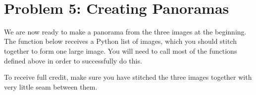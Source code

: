 \documentclass[11pt]{article}
\begin{document}
    \begin{center}
    \end{center}
    { \hspace*{\fill} \\}
    
    \section{Problem 5: Creating
Panoramas}\label{problem-5-creating-panoramas}

We are now ready to make a panorama from the three images at the
beginning. The function below receives a Python list of images, which
you should stitch together to form one large image. You will need to
call most of the functions defined above in order to successfully do
this.

To receive full credit, make sure you have stitched the three images
together with very little seam between them.
\end{document}
